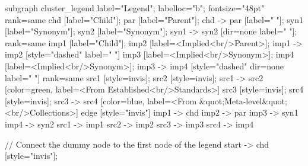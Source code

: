 \documentclass{article}
\begin{document}
{subgraph cluster_legend {
    label="Legend";
    labelloc="b";
    fontsize="48pt"
    {
        rank=same
        chd [label="Child"];
        par [label="Parent"];
        chd -> par [label="                "];
        syn1 [label="Synonym"];
        syn2 [label="Synonym"];
        syn1 -> syn2 [dir=none label="                "];
    }
    {
        rank=same
        imp1 [label="Child"];
        imp2 [label=<Implied<br/>Parent>];
        imp1 -> imp2 [style="dashed" label="                "]
        imp3 [label=<Implied<br/>Synonym>];
        imp4 [label=<Implied<br/>Synonym>];
        imp3 -> imp4 [style="dashed" dir=none label="                "]
    }
{
rank=same
src1 [style=invis];
src2 [style=invis];
src1 -> src2 [color=green, label=<From Established<br/>Standards>]
src3 [style=invis];
src4 [style=invis];
src3 -> src4 [color=blue, label=<From &quot;Meta-level&quot;<br/>Collections>]
}
    edge [style="invis"]
    imp1 -> chd
    imp2 -> par
    imp3 -> syn1
    imp4 -> syn2
src1 -> imp1
src2 -> imp2
src3 -> imp3
src4 -> imp4
}

// Connect the dummy node to the first node of the legend
start -> chd [style="invis"];
}
\end{document}
